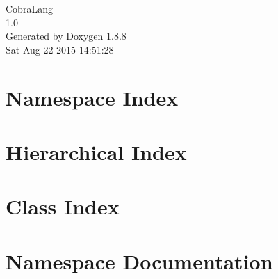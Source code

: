 \documentclass[twoside]{book}
\newcommand{\+}{\discretionary{\mbox{\scriptsize$\hookleftarrow$}}{}{}}
\newcommand{\clearemptydoublepage}{%
  \newpage{\pagestyle{empty}\cleardoublepage}%
}
\begin{document}
\hypersetup{pageanchor=false,
             bookmarks=true,
             bookmarksnumbered=true,
             pdfencoding=unicode
            }
\begin{titlepage}
\vspace*{7cm}
\begin{center}%
{\Large Cobra\+Lang \\[1ex]\large 1.\+0 }\\
\vspace*{1cm}
{\large Generated by Doxygen 1.8.8}\\
\vspace*{0.5cm}
{\small Sat Aug 22 2015 14:51:28}\\
\end{center}
\end{titlepage}
\clearemptydoublepage
\tableofcontents
\clearemptydoublepage
{}
\hypersetup{pageanchor=true}

\chapter{Namespace Index}

\chapter{Hierarchical Index}

\chapter{Class Index}

\chapter{Namespace Documentation}

\end{document}
